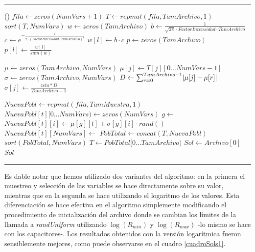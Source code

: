 \documentclass{llncs}
\makeatletter
\renewcommand{\ALG@name}{Algoritmo}
\newenvironment{breakablealgorithm}
{%
	\begin{center}
		\refstepcounter{algorithm}%
		\hrule height.8pt depth0pt \kern2pt%
		\renewcommand{\caption}[2][\relax]{%
			{\raggedright\textbf{\ALG@name~\thealgorithm} ##2\par}%
			\ifx\relax##1\relax %
			\addcontentsline{loa}{algorithm}{\protect\numberline{\thealgorithm}##2}%
			\else %
			\addcontentsline{loa}{algorithm}{\protect\numberline{\thealgorithm}##1}%
			\fi
			\kern2pt\hrule\kern2pt
		}
	}{%
		\kern2pt\hrule\relax%
	\end{center}
}
\DeclarePairedDelimiter\abs{\lvert}{\rvert}
\makeatother
\begin{document}
\begin{breakablealgorithm}
\begin{algorithmic}[1]
			()
			\State $fila \gets zeros(NumVars+1)$
			\State $T \gets repmat(fila, TamArchivo, 1)$
			\State {}
			\State $sort(T, NumVars)$
			\State $w \gets zeros(TamArchivo)$ 
			\State $b \gets  \frac{1}{\sqrt{2\pi} \cdot FactorIntensidad \cdot TamArchivo}$
			\State $c \gets e^{-\frac{l}{2 \cdot (FactorIntensidad \cdot TamArchivo)^2}}$
			\State $w[l] \gets b \cdot c $ 
			\EndFor
			\State $p \gets zeros(TamArchivo)$ 
			\State $p[l] \gets \frac{w[l]}{sum(w)}$
			\EndFor
			\item[]
			 
			\State $\mu \gets zeros(TamArchivo, NumVars)$ 
			\State $\mu[j] \gets T[j][0 \dots NumVars - 1]$
			\EndFor
			\State $\sigma \gets zeros(TamArchivo, NumVars)$ 
			\State $D \gets \sum_{r=0}^{TamArchivo - 1}\abs{\mu[j]-\mu[r]}$
			\State $\sigma[j] \gets \frac{zeta * D}{TamArchivo -1}$
			\EndFor
			\item[]
			\State $NuevaPobl \gets repmat(fila, TamMuestra, 1)$
			\State $NuevaPobl[t]\lbrack 0 \dots NumVars \rparen \gets zeros(NumVars)$
			\State $g \gets$  
			\State $NuevaPobl[t][i] \gets \mu[g][t] + \sigma[g][i] \cdot rand()$
			\EndFor
			\State $NuevaPobl[t][NumVars] \gets$ 
			\EndFor
			\State $PobTotal \gets concat(T, NuevaPobl)$
			\State $sort(PobTotal, NumVars)$
			\State $T \gets PobTotal \lbrack 0 \dots TamArchivo \rparen$ 
			\EndFor
			\State $Sol \gets Archivo[0]$
			\State \Return $Sol$
			\EndFunction
		\end{algorithmic}
	\end{breakablealgorithm}

	Es dable notar que hemos utilizado dos variantes del algoritmo: en la primera el muestreo y selección de las variables 
	se hace directamente sobre su valor, mientras que en la segunda se hace utilizando el logaritmo de los valores. Esta 
	diferenciación se hace efectiva en el algoritmo simplemente modificando el procedimiento de inicialización del archivo donde
	se cambian los límites de la llamada a \textit{randUniform} utilizando $\log(R_{min})$ y $\log(R_{max})$ -lo mismo se hace
	con los capacitores-. Los resultados obtenidos con la versión logarítmica fueron sensiblemente mejores, como puede observarse
	en el cuadro \ref{cuadroSols1}.
	
\end{document}
